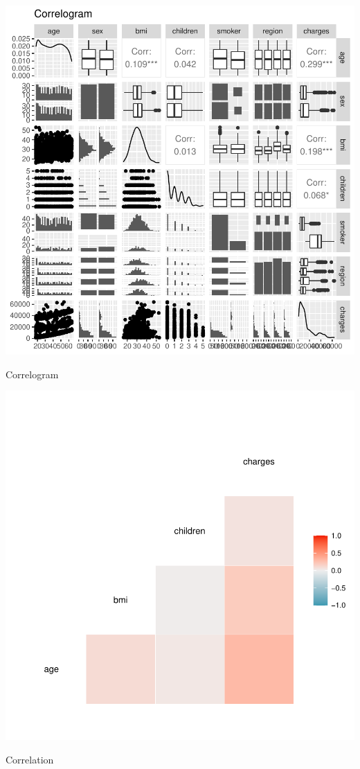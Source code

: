 \documentclass{article}
\begin{document}
\begin{centerfig}
\includegraphics{Untitled-042}
\caption{Correlogram}
\end{centerfig}

\begin{centerfig}
\includegraphics{Untitled-043}
\caption{Correlation}
\end{centerfig}
\end{document}
